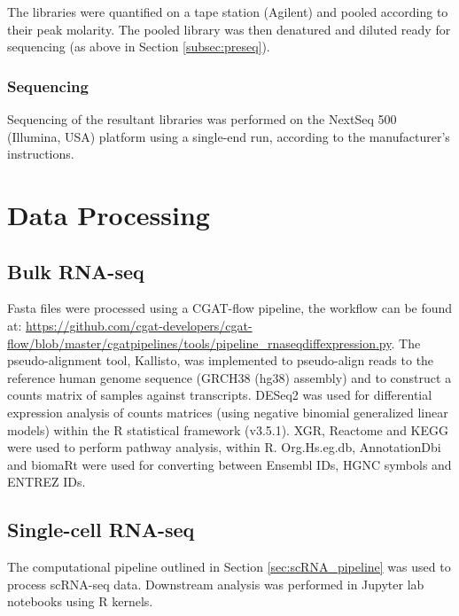 The libraries were quantified on a tape station (Agilent) and pooled according to their peak molarity.
The pooled library was then denatured and diluted ready for sequencing (as above in Section \ref{subsec:preseq}).


\subsubsection{Sequencing}
Sequencing of the resultant libraries was performed on the NextSeq 500 (Illumina, USA) platform using a single-end run, according to the manufacturer's instructions.

%

\section{Data Processing}\label{sec:data_processing}
\subsection{Bulk RNA-seq}\label{subsec:bulk_data_pro}
Fasta files were processed using a CGAT-flow\cite{sims2014cgat} pipeline, the workflow can be found at: \url{https://github.com/cgat-developers/cgat-flow/blob/master/cgatpipelines/tools/pipeline_rnaseqdiffexpression.py}.
The pseudo-alignment tool, Kallisto\cite{bray2016near}, was implemented to pseudo-align reads to the reference human genome sequence (GRCH38 (hg38) assembly) and to construct a counts matrix of samples against transcripts.
DESeq2\cite{love2014moderated} was used for differential expression analysis of  counts  matrices  (using  negative  binomial  generalized  linear  models) within the R statistical framework (v3.5.1).
XGR\cite{fang2016xgr}, Reactome\cite{fabregat2017reactome} and KEGG\cite{kanehisa2017kegg} were used to perform pathway analysis, within R\@.
Org.Hs.eg.db\cite{carlson2019org}, AnnotationDbi\cite{pages2020annotationdbi} and biomaRt\cite{durinck2009mapping} were used for converting between Ensembl IDs, HGNC symbols and ENTREZ IDs.

\subsection{Single-cell RNA-seq}
The computational pipeline outlined in Section \ref{sec:scRNA_pipeline} was used to process scRNA-seq data.
Downstream analysis was performed in Jupyter lab notebooks\cite{Kluyver2016jupyter} using R kernels.





